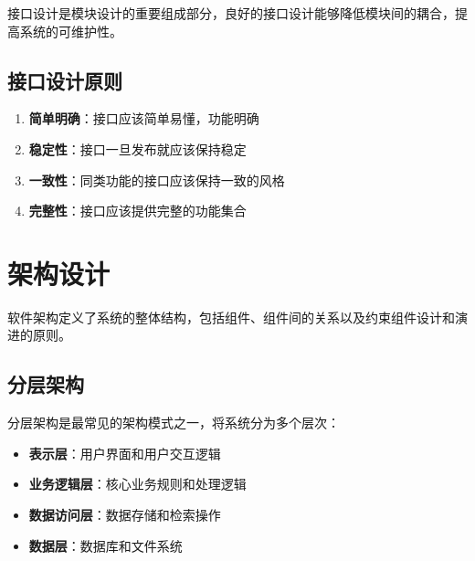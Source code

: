 接口设计是模块设计的重要组成部分，良好的接口设计能够降低模块间的耦合，提高系统的可维护性。

\subsection{接口设计原则}

\begin{enumerate}
    \item \textbf{简单明确}：接口应该简单易懂，功能明确
    \item \textbf{稳定性}：接口一旦发布就应该保持稳定
    \item \textbf{一致性}：同类功能的接口应该保持一致的风格
    \item \textbf{完整性}：接口应该提供完整的功能集合
\end{enumerate}

\section{架构设计}

软件架构定义了系统的整体结构，包括组件、组件间的关系以及约束组件设计和演进的原则。

\subsection{分层架构}

分层架构是最常见的架构模式之一，将系统分为多个层次：

\begin{itemize}
    \item \textbf{表示层}：用户界面和用户交互逻辑
    \item \textbf{业务逻辑层}：核心业务规则和处理逻辑
    \item \textbf{数据访问层}：数据存储和检索操作
    \item \textbf{数据层}：数据库和文件系统
\end{itemize}


